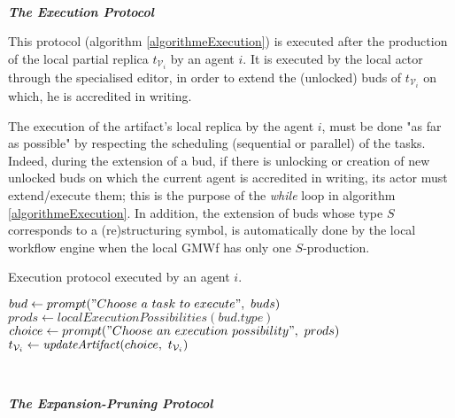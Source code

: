 ~

\noindent\textbf{\textit{The Execution Protocol}}

This protocol (algorithm \ref{algorithmeExecution}) is executed after the production of the local partial replica $t_{\mathcal{V}_{i}}$ by an agent $i$. It is executed by the local actor through the specialised editor, in order to extend the (unlocked) buds of $t_{\mathcal{V}_{i}}$ on which, he is accredited in writing.

The execution of the artifact's local replica by the agent $i$, must be done "as far as possible" by respecting the scheduling (sequential or parallel) of the tasks. Indeed, during the extension of a bud, if there is unlocking or creation of new unlocked buds on which the current agent is accredited in writing, its actor must extend/execute them; this is the purpose of the \textit{while} loop in algorithm \ref{algorithmeExecution}. In addition, the extension of buds whose type $S$ corresponds to a (re)structuring symbol, is automatically done by the local workflow engine when the local GMWf has only one $S$-production.

\begin{algorithm}
\small
\caption{Execution protocol executed by an agent $i$.\label{algorithmeExecution}}
\begin{algorithmic}[1]
			\State $bud \gets prompt("Choose~a~task~to~execute",~buds)$
			\State $prods \gets localExecutionPossibilities(bud.type)$
			\State $choice \gets prompt("Choose~an~execution~possibility",~prods)$
			\State $t_{\mathcal{V}_{i}} \gets \textrm{\textit{updateArtifact}}(choice,~t_{\mathcal{V}_{i}})$
		\EndWhile
	\EndProcedure
\end{algorithmic}
\end{algorithm}


~

\noindent\textbf{\textit{The Expansion-Pruning Protocol}}
\label{chap3:sec:execution-protocol-expansion-pruning}

